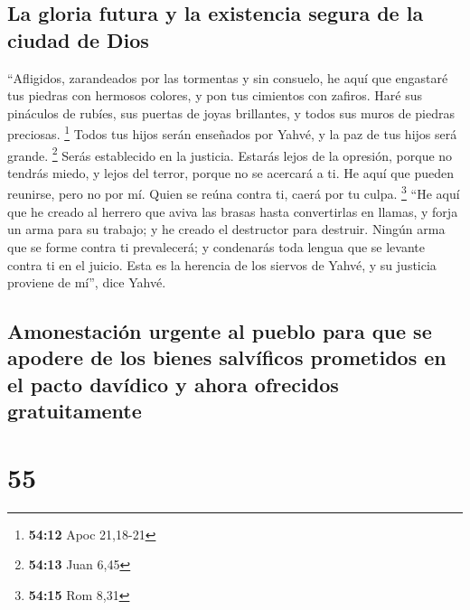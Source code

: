 \hypertarget{la-gloria-futura-y-la-existencia-segura-de-la-ciudad-de-dios}{%
\subsection{La gloria futura y la existencia segura de la ciudad de
Dios}\label{la-gloria-futura-y-la-existencia-segura-de-la-ciudad-de-dios}}

 ``Afligidos, zarandeados por las tormentas y sin
consuelo, he aquí que engastaré tus piedras con hermosos colores, y pon
tus cimientos con zafiros.  Haré sus pináculos de rubíes,
sus puertas de joyas brillantes, y todos sus muros de piedras preciosas.
\footnote{\textbf{54:12} Apoc 21,18-21}  Todos tus hijos
serán enseñados por Yahvé, y la paz de tus hijos será grande.
\footnote{\textbf{54:13} Juan 6,45}  Serás establecido en
la justicia. Estarás lejos de la opresión, porque no tendrás miedo, y
lejos del terror, porque no se acercará a ti.  He aquí
que pueden reunirse, pero no por mí. Quien se reúna contra ti, caerá por
tu culpa. \footnote{\textbf{54:15} Rom 8,31}  ``He aquí
que he creado al herrero que aviva las brasas hasta convertirlas en
llamas, y forja un arma para su trabajo; y he creado el destructor para
destruir.  Ningún arma que se forme contra ti
prevalecerá; y condenarás toda lengua que se levante contra ti en el
juicio. Esta es la herencia de los siervos de Yahvé, y su justicia
proviene de mí'', dice Yahvé.

\hypertarget{amonestaciuxf3n-urgente-al-pueblo-para-que-se-apodere-de-los-bienes-salvuxedficos-prometidos-en-el-pacto-davuxeddico-y-ahora-ofrecidos-gratuitamente}{%
\subsection{Amonestación urgente al pueblo para que se apodere de los
bienes salvíficos prometidos en el pacto davídico y ahora ofrecidos
gratuitamente}\label{amonestaciuxf3n-urgente-al-pueblo-para-que-se-apodere-de-los-bienes-salvuxedficos-prometidos-en-el-pacto-davuxeddico-y-ahora-ofrecidos-gratuitamente}}

\hypertarget{section-54}{%
\section{55}\label{section-54}}

